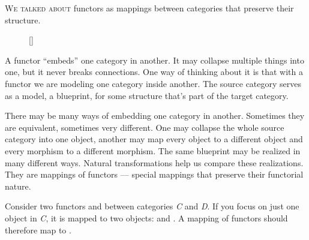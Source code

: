 \lettrine[lhang=0.17]{W}{e talked about} functors as mappings between categories that preserve
their structure.

\begin{figure}
\raisebox{0pt}[\dimexpr{}\baselineskip\relax]{
}%
\end{figure}

\noindent
A functor ``embeds'' one category in another. It may
collapse multiple things into one, but it never breaks connections. One
way of thinking about it is that with a functor we are modeling one
category inside another. The source category serves as a model, a
blueprint, for some structure that's part of the target category.

There may be many ways of embedding one category in another. Sometimes
they are equivalent, sometimes very different. One may collapse the
whole source category into one object, another may map every object to a
different object and every morphism to a different morphism. The same
blueprint may be realized in many different ways. Natural
transformations help us compare these realizations. They are mappings of
functors --- special mappings that preserve their functorial nature.

Consider two functors  and  between categories
\emph{C} and \emph{D}. If you focus on just one object  in
\emph{C}, it is mapped to two objects:  and .
A mapping of functors should therefore map  to
.

\begin{figure}[H]
\centering
{}
\end{figure}

